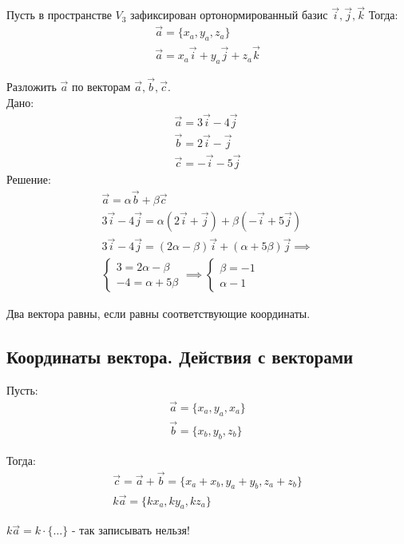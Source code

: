 \begin{eg}
  Пусть в пространстве $V_3$ зафиксирован ортонормированный базис $\vec{i}, \vec{j}, \vec{k}$
  Тогда:
  \begin{gather*}
    \vec{a} = \{x_a, y_a, z_a\} \\
    \vec{a} = x_a \vec{i} + y_a \vec{j} + z_a \vec{k}
  \end{gather*}
\end{eg}

\exercise{}
Разложить $\vec{a}$ по векторам $\vec{a}, \vec{b}, \vec{c}$. \\
Дано:
\begin{gather*}
  \vec{a} = 3 \vec{i} - 4 \vec{j} \\
  \vec{b} = 2 \vec{i} -   \vec{j} \\
  \vec{c} = - \vec{i} - 5 \vec{j}
\end{gather*}
Решение:
\begin{gather*}
  \vec{a} = \alpha \vec{b} + \beta \vec{c} \\
  3 \vec{i} - 4 \vec{j} = \alpha(2 \vec{i} + \vec{j}) + \beta (- \vec{i} + 5 \vec{j}) \\
  3 \vec{i} - 4 \vec{j} = (2 \alpha - \beta) \vec{i} + (\alpha + 5 \beta) \vec{j} \implies \\
  \begin{cases}
    3 = 2 \alpha - \beta \\
    -4 = \alpha + 5 \beta
  \end{cases} 
  \implies 
  \begin{cases}
    \beta = -1 \\
    \alpha - 1
  \end{cases}
\end{gather*}

\begin{note}
  Два вектора равны, если равны соответствующие координаты.
\end{note}

\subsection{Координаты вектора. Действия с векторами}

Пусть:
\begin{gather*}
  \vec{a} = \{x_a, y_a, x_a\} \\
  \vec{b} = \{x_b, y_b, z_b \}
\end{gather*}

Тогда:
\begin{gather*}
  \vec{c} = \vec{a} + \vec{b} = \{x_a + x_b, y_a + y_b, z_a + z_b\} \\ 
  k \vec{a} = \{k x_a, k y_a, k z_a\} 
\end{gather*}
\begin{note}
  $k \vec{a} = k \cdot \{ \ldots \} $ - так записывать нельзя!
\end{note}

